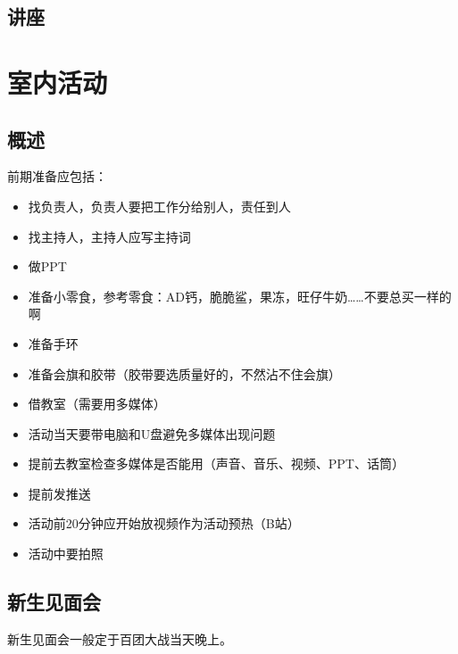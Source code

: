 \documentclass{ctexbook}
\begin{document}
\subsection{讲座}
\section{室内活动}
\subsection{概述}

前期准备应包括：
\begin{itemize}
\item 找负责人，负责人要把工作分给别人，责任到人
\item 找主持人，主持人应写主持词
\item 做PPT
\item 准备小零食，参考零食：AD钙，脆脆鲨，果冻，旺仔牛奶……不要总买一样的啊
\item 准备手环
\item 准备会旗和胶带（胶带要选质量好的，不然沾不住会旗）
\item 借教室（需要用多媒体）
\item 活动当天要带电脑和U盘避免多媒体出现问题
\item 提前去教室检查多媒体是否能用（声音、音乐、视频、PPT、话筒）
\item 提前发推送
\item 活动前20分钟应开始放视频作为活动预热（B站）
\item 活动中要拍照
\end{itemize}
\subsection{新生见面会}
新生见面会一般定于百团大战当天晚上。
\end{document}
